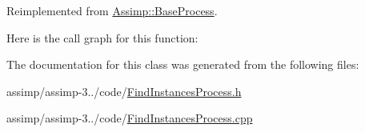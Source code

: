 Reimplemented from \hyperlink{class_assimp_1_1_base_process_aae14d0a8c5918642d4a272b7b74b5d70}{Assimp\+::\+Base\+Process}.



Here is the call graph for this function\+:




The documentation for this class was generated from the following files\+:\begin{DoxyCompactItemize}
\item 
assimp/assimp-\/3../code/\hyperlink{_find_instances_process_8h}{Find\+Instances\+Process.\+h}\item 
assimp/assimp-\/3../code/\hyperlink{_find_instances_process_8cpp}{Find\+Instances\+Process.\+cpp}\end{DoxyCompactItemize}

